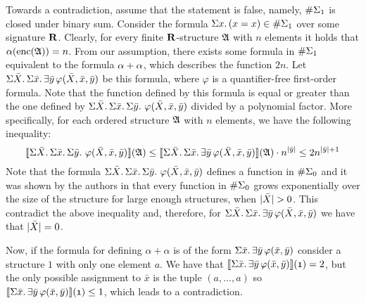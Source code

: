 Towards a contradiction, assume that the statement is false, namely, $\#\Sigma_{1}$ is closed under binary sum. Consider the formula $\Sigma{x}.\,(x = x) \in \#\Sigma_{1}$ over some signature $\mathbf{R}$. Clearly, for every finite $\mathbf{R}$-structure $\mathfrak{A}$ with $n$ elements it holds that $\alpha({\rm enc}(\mathfrak{A})) = n$. From our assumption, there exists some formula in $\#\Sigma_{1}$ equivalent to the formula $\alpha + \alpha$, which describes the function $2n$. Let $\Sigma{\bar{X}}.\,\Sigma{\bar{x}}.\,\exists\bar{y}\,\varphi(\bar{X},\bar{x},\bar{y})$ be this formula, where $\varphi$ is a quantifier-free first-order formula. Note that the function defined by this formula is equal or greater than the one defined by $\Sigma{\bar{X}}.\,\Sigma{\bar{x}}.\,\Sigma{\bar{y}}.\,\,\varphi(\bar{X},\bar{x},\bar{y})$ divided by a polynomial factor. More specifically, for each ordered structure $\mathfrak{A}$ with $n$ elements, we have the following inequality:
$$
{\llbracket{}{\Sigma{\bar{X}}.\,\Sigma{\bar{x}}.\,\Sigma{\bar{y}}.\,\,\varphi(\bar{X},\bar{x},\bar{y})}\rrbracket}(\mathfrak{A})
\leq 
{\llbracket{}{\Sigma{\bar{X}}.\,\Sigma{\bar{x}}.\,\exists\bar{y}\,\varphi(\bar{X},\bar{x},\bar{y})}\rrbracket}(\mathfrak{A}) \cdot  n^{\vert \bar{y} \vert} \leq 2n^{\vert \bar{y} \vert+1} 
$$
Note that the formula $\Sigma{\bar{X}}.\,\Sigma{\bar{x}}.\,\Sigma{\bar{y}}.\,\,\varphi(\bar{X},\bar{x},\bar{y})$ defines a function in $\#\Sigma_{0}$ and it was shown by the authors in \cite{SalujaST95} that every function in $\#\Sigma_{0}$ grows exponentially over the size of the structure for large enough structures, when $\vert \bar{X} \vert > 0$. This contradict the above inequality and, therefore, for $\Sigma{\bar{X}}.\,\Sigma{\bar{x}}.\,\exists\bar{y}\,\varphi(\bar{X},\bar{x},\bar{y})$ we have that $\vert \bar{X} \vert = 0$.

Now, if the formula for defining $\alpha + \alpha$ is of the form $\Sigma{\bar{x}}.\,\exists\bar{y}\,\varphi(\bar{x},\bar{y})$ consider a structure $\mathfrak{1}$ with only one element $a$. We have that ${\llbracket{}{\Sigma{\bar{x}}.\,\exists\bar{y}\,\varphi(\bar{x},\bar{y})}\rrbracket}(\mathfrak{1}) = 2$, but the only possible assignment to $\bar{x}$ is the tuple $(a,\ldots,a)$ so ${\llbracket{}{\Sigma{\bar{x}}.\,\exists\bar{y}\,\varphi(\bar{x},\bar{y})}\rrbracket}(\mathfrak{1}) \leq 1$, which leads to a contradiction.

